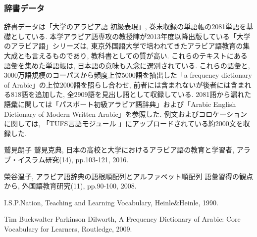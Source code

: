 \documentclass[technicalreport]{ieicej}
\begin{document}
\subsubsection{辞書データ}
辞書データは「大学のアラビア語 初級表現」, 巻末収録の単語帳の2081単語を基礎としている. 本学アラビア語専攻の教授陣が2013年度以降出版している「大学のアラビア語」シリーズは, 東京外国語大学で培われてきたアラビア語教育の集大成とも言えるものであり, 教科書としての質が高い. これらのテキストにある語彙を集めた単語帳は, 日本語の意味も入念に選別されている. これらの語彙と, 3000万語規模のコーパスから頻度上位5000語を抽出した「a frequency dictionary of Arabic」の上位2000語を照らし合わせ, 前者には含まれないが後者には含まれる818語を追加した, 全2909語を見出し語として収録している. 2081語から漏れた語彙に関しては「パスポート初級アラビア語辞典」および「Arabic English Dictionary of Modern Written Arabic」を参照した. 例文およびコロケーションに関しては, 「TUFS言語モジュール 」にアップロードされている約2000文を収録した.

\begin{thebibliography}{99}
鷲見朗子 鷲見克典, 日本の高校と大学におけるアラビア語の教育と学習者, アラブ・イスラム研究(14), pp.103-121, 2016.

榮谷温子, アラビア語辞典の語根順配列とアルファベット順配列 語彙習得の観点から, 外国語教育研究(11), pp.90-100, 2008.

I.S.P.Nation, Teaching and Learning Vocabulary, Heinle\&Heinle, 1990. 

Tim Buckwalter  Parkinson Dilworth, A Frequency Dictionary of Arabic: Core Vocabulary for Learners, Routledge, 2009.

\end{thebibliography}
\end{document}
